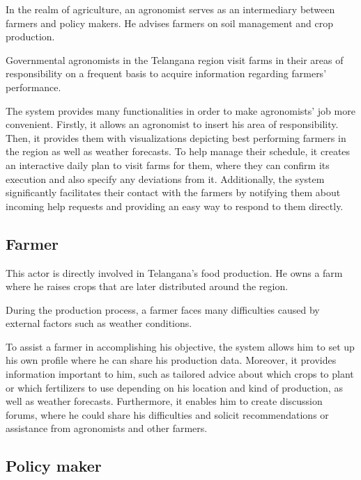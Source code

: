 In the realm of agriculture, an agronomist serves as an intermediary between farmers and policy makers. He advises farmers on soil management and crop production.

Governmental agronomists in the Telangana region visit farms in their areas of responsibility on a frequent basis to acquire information regarding farmers' performance.

The system provides many functionalities in order to make agronomists' job more convenient. Firstly, it allows an agronomist to insert his area of responsibility. Then, it provides them with visualizations depicting best performing farmers in the region as well as weather forecasts. To help manage their schedule, it creates an interactive daily plan to visit farms for them, where they can confirm its execution and also specify any deviations from it. Additionally, the system significantly facilitates their contact with the farmers by notifying them about incoming help requests and providing an easy way to respond to them directly.

\subsection{Farmer} \label{subsec:farmer}

This actor is directly involved in Telangana's food production. He owns a farm where he raises crops that are later distributed around the region.

During the production process, a farmer faces many difficulties caused by external factors such as weather conditions.

To assist a farmer in accomplishing his objective, the system allows him to set up his own profile where he can share his production data. Moreover, it provides information important to him, such as tailored advice about which crops to plant or which fertilizers to use depending on his location and kind of production, as well as weather forecasts. Furthermore, it enables him to create discussion forums, where he could share his difficulties and solicit recommendations or assistance from agronomists and other farmers.

\subsection{Policy maker} \label{subsec:policy_maker}


